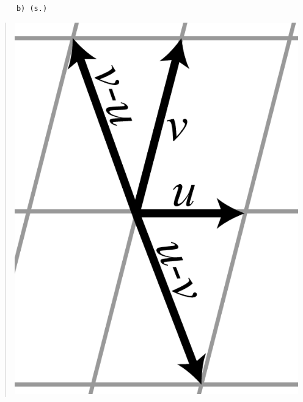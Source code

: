 \documentclass[a4paper]{article}
\newcommand{\tskcol}[1]{\textcolor{tskcol}{#1}}
\begin{document}
\texttt{\tskcol{~~~~~~b) (s.)}}
\begin{quotation}
	\noindent
	\includegraphics[scale=0.1]{images/21b.PNG}
\end{quotation}
\end{document}
